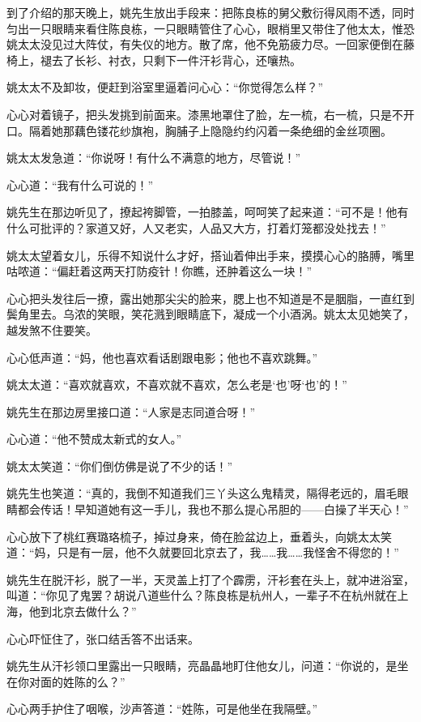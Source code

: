 \par 到了介绍的那天晚上，姚先生放出手段来：把陈良栋的舅父敷衍得风雨不透，同时匀出一只眼睛来看住陈良栋，一只眼睛管住了心心，眼梢里又带住了他太太，惟恐姚太太没见过大阵仗，有失仪的地方。散了席，他不免筋疲力尽。一回家便倒在藤椅上，褪去了长衫、衬衣，只剩下一件汗衫背心，还嚷热。
\par 姚太太不及卸妆，便赶到浴室里逼着问心心：“你觉得怎么样？”
\par 心心对着镜子，把头发挑到前面来。漆黑地罩住了脸，左一梳，右一梳，只是不开口。隔着她那藕色镂花纱旗袍，胸脯子上隐隐约约闪着一条绝细的金丝项圈。
\par 姚太太发急道：“你说呀！有什么不满意的地方，尽管说！”
\par 心心道：“我有什么可说的！”
\par 姚先生在那边听见了，撩起袴脚管，一拍膝盖，呵呵笑了起来道：“可不是！他有什么可批评的？家道又好，人又老实，人品又大方，打着灯笼都没处找去！”
\par 姚太太望着女儿，乐得不知说什么才好，搭讪着伸出手来，摸摸心心的胳膊，嘴里咕哝道：“偏赶着这两天打防疫针！你瞧，还肿着这么一块！”
\par 心心把头发往后一撩，露出她那尖尖的脸来，腮上也不知道是不是胭脂，一直红到鬓角里去。乌浓的笑眼，笑花溅到眼睛底下，凝成一个小酒涡。姚太太见她笑了，越发煞不住要笑。
\par 心心低声道：“妈，他也喜欢看话剧跟电影；他也不喜欢跳舞。”
\par 姚太太道：“喜欢就喜欢，不喜欢就不喜欢，怎么老是‘也’呀‘也’的！”
\par 姚先生在那边房里接口道：“人家是志同道合呀！”
\par 心心道：“他不赞成太新式的女人。”
\par 姚太太笑道：“你们倒仿佛是说了不少的话！”
\par 姚先生也笑道：“真的，我倒不知道我们三丫头这么鬼精灵，隔得老远的，眉毛眼睛都会传话！早知道她有这一手儿，我也不那么提心吊胆的——白操了半天心！”
\par 心心放下了桃红赛璐珞梳子，掉过身来，倚在脸盆边上，垂着头，向姚太太笑道：“妈，只是有一层，他不久就要回北京去了，我……我……我怪舍不得您的！”
\par 姚先生在脱汗衫，脱了一半，天灵盖上打了个霹雳，汗衫套在头上，就冲进浴室，叫道：“你见了鬼罢？胡说八道些什么？陈良栋是杭州人，一辈子不在杭州就在上海，他到北京去做什么？”
\par 心心吓怔住了，张口结舌答不出话来。
\par 姚先生从汗衫领口里露出一只眼睛，亮晶晶地盯住他女儿，问道：“你说的，是坐在你对面的姓陈的么？”
\par 心心两手护住了咽喉，沙声答道：“姓陈，可是他坐在我隔壁。”
